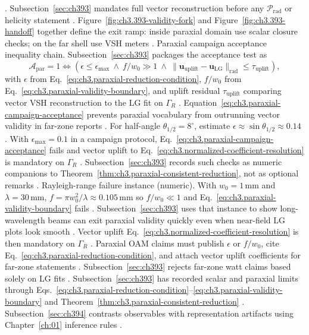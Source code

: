 \cite{jackson1999}. Subsection~\ref{sec:ch393} mandates full vector reconstruction before any \(\mathcal{P}_{\mathrm{rad}}\) or
helicity statement \cite{belinfante1940}. Figure~\ref{fig:ch3.393-validity-fork} and Figure~\ref{fig:ch3.393-handoff} together define the exit ramp:
inside paraxial domain use scalar closure checks; on the far shell use VSH meters \cite{allen1992}.
Paraxial campaign acceptance inequality chain. Subsection~\ref{sec:ch393} packages the acceptance test as
\begin{equation}
\label{eq:ch3.paraxial-campaign-acceptance}
\mathcal{A}_{\mathrm{par}}=1
\iff
\left(
\epsilon\le\epsilon_{\max}\
\wedge\
f/w_{0}\gg 1\
\wedge\
\|\mathbf{u}_{\mathrm{uplift}}-\mathbf{u}_{\mathrm{LG}}\|_{\mathrm{rad}}\le \tau_{\mathrm{uplift}}
\right),
\end{equation}
with \(\epsilon\) from Eq.~\eqref{eq:ch3.paraxial-reduction-condition}, \(f/w_{0}\) from Eq.~\eqref{eq:ch3.paraxial-validity-boundary}, and uplift residual \(\tau_{\mathrm{uplift}}\) comparing vector VSH reconstruction to the LG fit on \(\Gamma_R\)
\cite{allen1992}. Equation~\eqref{eq:ch3.paraxial-campaign-acceptance} prevents paraxial vocabulary from outrunning vector validity in far-zone reports
\cite{belinfante1940}.
For half-angle \(\theta_{1/2}=8^{\circ}\), estimate \(\epsilon\approx\sin\theta_{1/2}\approx0.14\) \cite{jackson1999}. With \(\epsilon_{\max}=0.1\) in a campaign protocol, Eq.~\eqref{eq:ch3.paraxial-campaign-acceptance} fails and vector uplift to Eq.~\eqref{eq:ch3.normalized-coefficient-resolution} is mandatory on \(\Gamma_R\)
\cite{harrington2001}. Subsection~\ref{sec:ch393} records such checks as numeric companions to Theorem~\ref{thm:ch3.paraxial-consistent-reduction}, not as optional remarks
\cite{allen1992}.
Rayleigh-range failure instance (numeric). With \(w_{0}=1\,\mathrm{mm}\) and \(\lambda=30\,\mathrm{mm}\), \(f=\pi w_{0}^{2}/\lambda\approx0.105\,\mathrm{mm}\) so \(f/w_{0}\ll1\) and Eq.~\eqref{eq:ch3.paraxial-validity-boundary} fails \cite{jackson1999}. Subsection~\ref{sec:ch393} uses that instance to show long-wavelength beams can exit paraxial validity quickly even when near-field LG plots look smooth
\cite{harrington2001}. Vector uplift Eq.~\eqref{eq:ch3.normalized-coefficient-resolution} is then mandatory on \(\Gamma_R\)
\cite{hansen1988}.
Paraxial OAM claims must publish \(\epsilon\) or \(f/w_{0}\), cite Eq.~\eqref{eq:ch3.paraxial-reduction-condition}, and attach vector uplift
coefficients for far-zone statements \cite{allen1992}. Subsection~\ref{sec:ch393} rejects far-zone watt
claims based solely on LG fits \cite{harrington2001}.
Subsection~\ref{sec:ch393} has recorded scalar and paraxial limits through
Eqs.~\eqref{eq:ch3.paraxial-reduction-condition}--\eqref{eq:ch3.paraxial-validity-boundary} and
Theorem~\ref{thm:ch3.paraxial-consistent-reduction} \cite{allen1992}. Subsection~\ref{sec:ch394} contrasts
observables with representation artifacts using Chapter~\ref{ch:01} inference rules \cite{harrington2001}.
